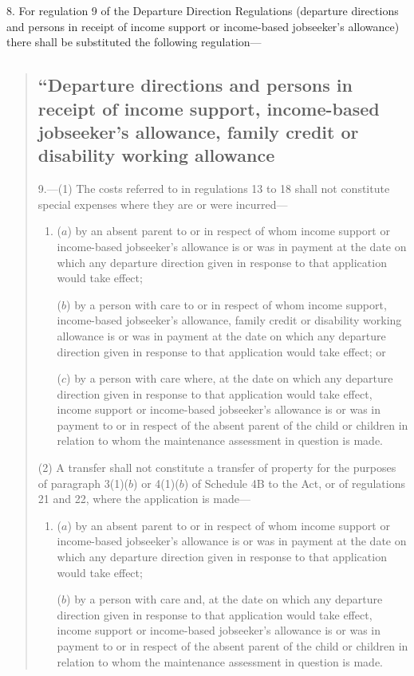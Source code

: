 \documentclass[12pt,a4paper]{article}
\begin{document}
8.  For regulation 9 of the Departure Direction Regulations (departure directions and persons in receipt of income support or income-based jobseeker’s allowance) there shall be substituted the following regulation—
\begin{quotation}
\subsection*{\sloppy “Departure directions and persons in receipt of income support, income-based jobseeker’s allowance, family credit or disability working allowance}

9.—(1) The costs referred to in regulations 13 to 18 shall not constitute special expenses where they are or were incurred—
\begin{enumerate}\item[]
($a$) by an absent parent to or in respect of whom income support or income-based jobseeker’s allowance is or was in payment at the date on which any departure direction given in response to that application would take effect;

($b$) by a person with care to or in respect of whom income support, income-based jobseeker’s allowance, family credit or disability working allowance is or was in payment at the date on which any departure direction given in response to that application would take effect; or

($c$) by a person with care where, at the date on which any departure direction given in response to that application would take effect, income support or income-based jobseeker’s allowance is or was in payment to or in respect of the absent parent of the child or children in relation to whom the maintenance assessment in question is made.
\end{enumerate}

(2) A transfer shall not constitute a transfer of property for the purposes of paragraph 3(1)($b$) or 4(1)($b$) of Schedule 4B to the Act, or of regulations 21 and 22, where the application is made—
\begin{enumerate}\item[]
($a$) by an absent parent to or in respect of whom income support or income-based jobseeker’s allowance is or was in payment at the date on which any departure direction given in response to that application would take effect;

($b$) by a person with care and, at the date on which any departure direction given in response to that application would take effect, income support or income-based jobseeker’s allowance is or was in payment to or in respect of the absent parent of the child or children in relation to whom the maintenance assessment in question is made.
\end{enumerate}


\end{quotation}
\end{document}
